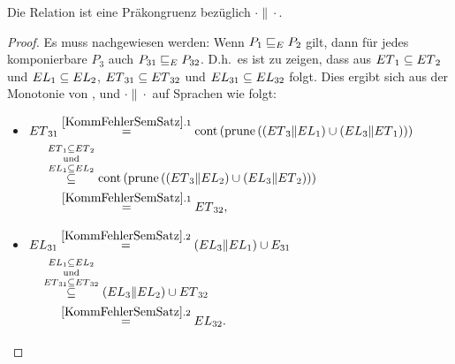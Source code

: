 \begin{Kor}
  \label{KommPraekonKor}
  Die Relation \ERel{} ist eine Präkongruenz bezüglich $\cdot\|\cdot$.
\end{Kor}
\begin{proof}
  Es muss nachgewiesen werden: Wenn $P_1 \sqsubseteq  _E P_2$ gilt, dann für jedes
  komponierbare $P_3$ auch $P_{31} \sqsubseteq  _E P_{32}$. D.h.\ es ist zu zeigen,
  dass aus $ET{}_1\subseteq ET{}_2$ und $EL{}_1\subseteq EL{}_2$,
  $ET{}_{31}\subseteq ET{}_{32}$ und $EL{}_{31}\subseteq
  EL{}_{32}$ folgt. Dies ergibt sich aus der Monotonie von \cont{},
  \prune{} und $\cdot \|\cdot$ auf Sprachen wie folgt:\\
  \begin{itemize}
    \item $\begin{aligned}[t]
        \ET{}_{31} &\overset{\ref{KommFehlerSemSatz}.1}{=}
      \cont{}\left(\prune{}\left(\left(\ET{}_3\|\EL{}_1\right)\cup
          \left(\EL{}_3\|\ET{}_1\right)\right)\right)\\
      &\hspace{-0.4cm}\overset{\ET{}_1\subseteq
    \ET{}_2}{\overset{\mathrm{und}}{\overset{\EL{}_1\subseteq \EL{}_2}{\subseteq}}}
    \cont{}\left(\prune{}\left(\left(\ET{}_3\|\EL{}_2\right)\cup
        \left(\EL{}_3\|\ET{}_2\right)\right)\right)\\
    &\overset{\ref{KommFehlerSemSatz}.1}{=} \ET{}_{32},
    \end{aligned}$
    \item $\begin{aligned}[t]
        \EL{}_{31} &\overset{\ref{KommFehlerSemSatz}.2}{=}
        (\EL{}_3\|\EL{}_1)\cup E_{31}\\
        &\hspace{-0.5cm}\overset{\EL{}_1\subseteq
      \EL{}_2}{\overset{\mathrm{und}}{\overset{\ET{}_{31}\subseteq
      \ET{}_{32}}{\subseteq}}} (\EL{}_3\|\EL{}_2)\cup \ET{}_{32}\\
      &\overset{\ref{KommFehlerSemSatz}.2}{=} \EL{}_{32}.
    \end{aligned}$
  \end{itemize}
\end{proof}

